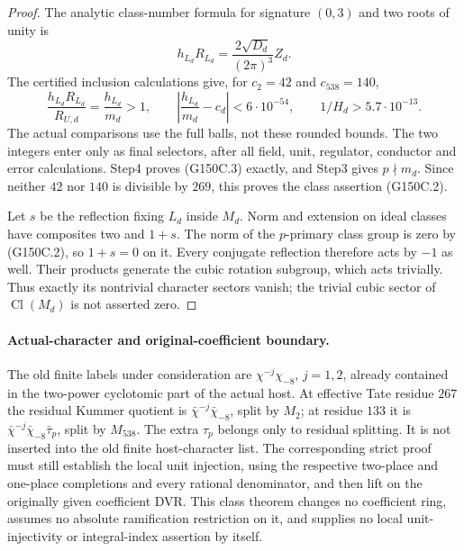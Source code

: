 \begin{proof}
The analytic class-number formula for signature $(0,3)$ and
two roots of unity is
\[
 h_{L_d}R_{L_d}=\frac{2\sqrt{D_d}}{(2\pi)^3}Z_d.
 \tag{G150C.29}
\]
The certified inclusion calculations give, for $c_2=42$ and
$c_{538}=140$,
\[
 \frac{h_{L_d}R_{L_d}}{R_{U,d}}=\frac{h_{L_d}}{m_d}>1,
 \qquad \left|\frac{h_{L_d}}{m_d}-c_d\right|<6\cdot10^{-54},
 \qquad 1/H_d>5.7\cdot10^{-13}.
 \tag{G150C.30}
\]
The actual comparisons use the full balls, not these rounded
bounds.  The two integers enter only as final selectors, after
all field, unit, regulator, conductor and error calculations.
Step4 proves (G150C.3) exactly, and Step3 gives $p\nmid m_d$.
Since neither $42$ nor $140$ is divisible by $269$, this proves
the class assertion (G150C.2).

Let $s$ be the reflection fixing $L_d$ inside $M_d$.
Norm and extension on ideal classes have composites two and
$1+s$.  The norm of the $p$-primary class group is zero by
(G150C.2), so $1+s=0$ on it.
Every conjugate reflection therefore acts by $-1$ as well.
Their products generate the cubic rotation subgroup, which acts
trivially.  Thus exactly its nontrivial character sectors vanish;
the trivial cubic sector of $\operatorname{Cl}(M_d)$ is not asserted zero.
\end{proof}

\paragraph{Actual-character and original-coefficient boundary.}
The old finite labels under consideration are
$\chi^{-j}\chi_{-8}$, $j=1,2$, already contained in the
two-power cyclotomic part of the actual host.
At effective Tate residue $267$ the residual Kummer quotient is
$\bar\chi^{-j}\bar\chi_{-8}$, split by $M_2$;
at residue $133$ it is
$\bar\chi^{-j}\bar\chi_{-8}\bar\tau_p$, split by $M_{538}$.
The extra $\tau_p$ belongs only to residual splitting.
It is not inserted into the old finite host-character list.
The corresponding strict proof must still establish the local
unit injection, using the respective two-place and one-place
completions and every rational denominator, and then lift on
the originally given coefficient DVR.
This class theorem changes no coefficient ring, assumes no
absolute ramification restriction on it, and supplies no local
unit-injectivity or integral-index assertion by itself.

